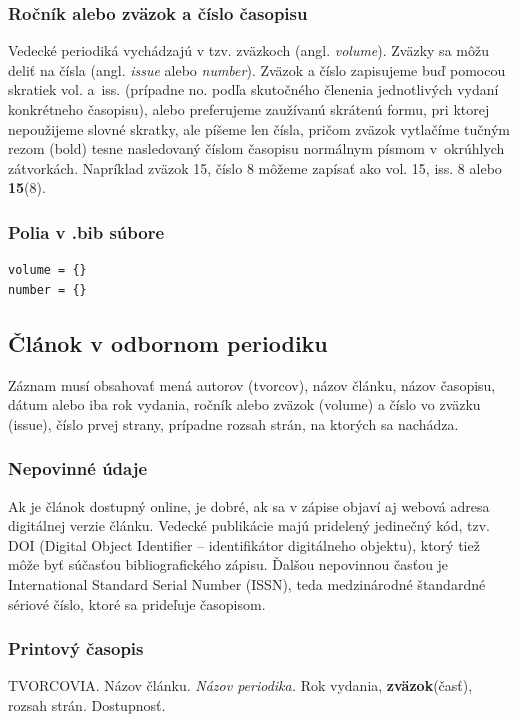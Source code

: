 \subsubsection*{Ročník alebo zväzok a číslo časopisu}
Vedecké periodiká vychádzajú v tzv. zväzkoch (angl. \foreignlanguage{english}{\it volume}).
Zväzky sa môžu deliť na čísla
(angl. \foreignlanguage{english}{\it issue} alebo
\foreignlanguage{english}{\it number}).
Zväzok a číslo zapisujeme buď pomocou skratiek vol. a~iss.
(prípadne no. podľa skutočného členenia jednotlivých vydaní konkrétneho časopisu),
alebo preferujeme zaužívanú skrátenú formu,
pri ktorej nepoužijeme slovné skratky,
ale píšeme len čísla,
pričom zväzok vytlačíme tučným rezom (bold)
tesne nasledovaný číslom časopisu normálnym písmom
v~okrúhlych zátvorkách.
Napríklad zväzok 15, číslo 8 môžeme zapísať
ako vol. 15, iss. 8 alebo \textbf{15}(8).

\subsubsection*{\normalsize Polia v .bib súbore}
\begin{verbatim}
volume = {}
number = {}
\end{verbatim}

\subsection{Článok v odbornom periodiku}
Záznam musí obsahovať mená autorov (tvorcov), názov článku, názov časopisu, dátum alebo iba rok vydania, ročník alebo zväzok (volume) a číslo vo zväzku (issue), číslo prvej strany, prípadne rozsah strán, na ktorých sa nachádza.

\subsubsection*{\normalsize Nepovinné údaje}
Ak je článok dostupný online, je dobré, ak sa v zápise objaví aj webová adresa digitálnej verzie článku. Vedecké publikácie majú pridelený jedinečný kód, tzv. DOI (Digital Object Identifier – identifikátor digitálneho objektu), ktorý tiež môže byť súčasťou bibliografického zápisu. Ďalšou nepovinnou časťou je International Standard Serial Number (ISSN), teda medzinárodné štandardné sériové číslo, ktoré sa prideľuje časopisom.

\subsubsection*{\normalsize Printový časopis}
\begin{trivlist}
\item TVORCOVIA. Názov článku. \textit{Názov periodika.} Rok vydania, \textbf{zväzok}(časť), rozsah strán. Dostupnosť.
\end{trivlist}

